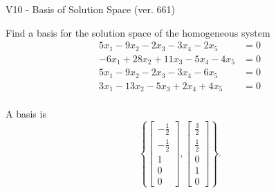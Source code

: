 \begin{exercise}
  \begin{exerciseTitle}V10 - Basis of Solution Space (ver. 661)\end{exerciseTitle}
  \begin{exerciseStatement}
    Find a basis for the solution space of the homogeneous system 
\begin{align*}
 5 x_ 1 -9 x_ 2 -2 x_ 3 -3 x_ 4 -2 x_ 5 &= 0  \\ 
  -6 x_ 1 + 28 x_ 2 + 11 x_ 3 -5 x_ 4 -4 x_ 5 &= 0  \\ 
  5 x_ 1 -9 x_ 2 -2 x_ 3 -3 x_ 4 -6 x_ 5 &= 0  \\ 
  3 x_ 1 -13 x_ 2 -5 x_ 3 + 2 x_ 4 + 4 x_ 5 &= 0  \\ 
 \end{align*}


 
  \end{exerciseStatement}

  \begin{exerciseAnswer}
   A basis is   
\[\left\{\left[\begin{array}{c}
-\frac{1}{2} \\
-\frac{1}{2} \\
1 \\
0 \\
0
\end{array}\right] , \left[\begin{array}{c}
\frac{3}{2} \\
\frac{1}{2} \\
0 \\
1 \\
0
\end{array}\right]\right\}.\]

  


  \end{exerciseAnswer}
\end{exercise}